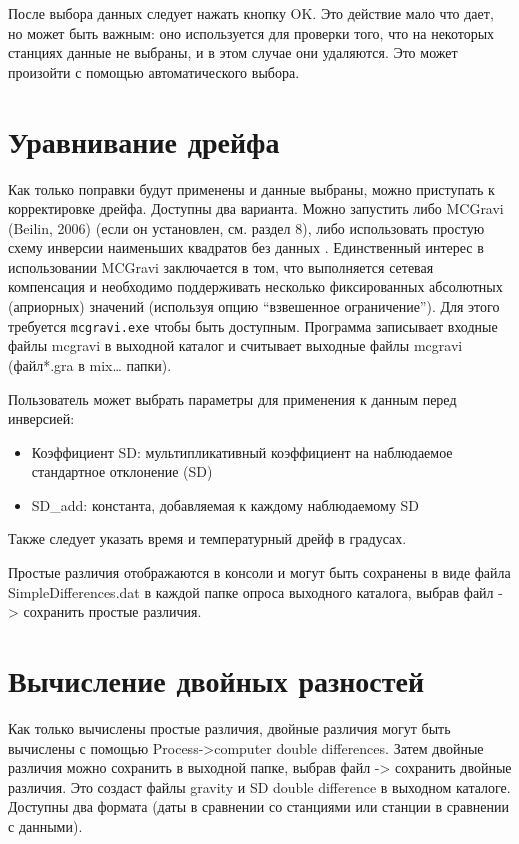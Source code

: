 После выбора данных следует нажать кнопку OK. Это действие мало что дает, но
может быть важным: оно используется для проверки того, что на некоторых станциях
данные не выбраны, и в этом случае они удаляются. Это может произойти с помощью
автоматического выбора.

\section[Уравнивание дрейфа]{Уравнивание дрейфа}
\label{sec:drift_adjustment}

Как только поправки будут применены и данные выбраны, можно приступать к
корректировке дрейфа. Доступны два варианта. Можно запустить либо MCGravi
(Beilin, 2006) (если он установлен, см. раздел 8), либо использовать простую
схему инверсии наименьших квадратов без данных \cite{hwang_adjustment_2002}.
Единственный интерес в использовании MCGravi заключается в том, что выполняется
сетевая компенсация и необходимо поддерживать несколько фиксированных абсолютных
(априорных) значений (используя опцию “взвешенное ограничение”). Для этого
требуется \verb|mcgravi.exe| чтобы быть доступным. Программа записывает входные файлы
mcgravi в выходной каталог и считывает выходные файлы mcgravi (файл*.gra в mix…
папки). 

Пользователь может выбрать параметры для применения к данным перед инверсией:
\begin{itemize}
    \item Коэффициент SD: мультипликативный коэффициент на наблюдаемое
    стандартное отклонение (SD)
    
    \item SD\_add: константа, добавляемая к каждому наблюдаемому SD
\end{itemize}

Также следует указать время и температурный дрейф в градусах.

Простые различия отображаются в консоли и могут быть сохранены в виде файла
SimpleDifferences.dat в каждой папке опроса выходного каталога, выбрав файл ->
сохранить простые различия.

\section[Вычисление двойных разностей]{Вычисление двойных разностей}
\label{sec:compute_double_differences}

Как только вычислены простые различия, двойные различия могут быть вычислены с
помощью Process->computer double differences. Затем двойные различия можно
сохранить в выходной папке, выбрав файл -> сохранить двойные различия. Это
создаст файлы gravity и SD double difference в выходном каталоге. Доступны два
формата (даты в сравнении со станциями или станции в сравнении с данными).